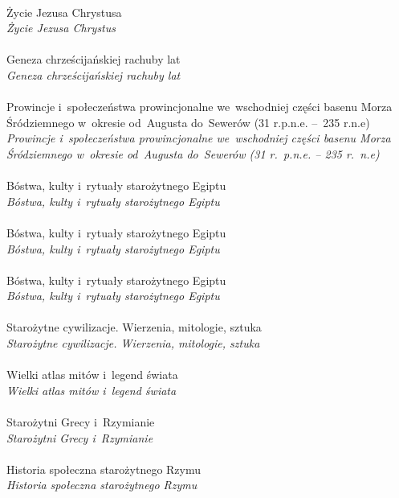 \documentclass[a4paper,11pt]{article}
\begin{document}
 \\
\Jest  Życie Jezusa Chrystusa \\
\Powin \emph{Życie Jezusa Chrystus} \\
 \\
\Jest  Geneza chrześcijańskiej rachuby lat \\
\Powin \emph{Geneza chrześcijańskiej rachuby lat} \\
 \\
\Jest Prowincje i~społeczeństwa prowincjonalne we~wschodniej części
basenu Morza Śródziemnego w~okresie od~Augusta do~Sewerów
(31 r.p.n.e. --~235 r.n.e) \\
\Powin \emph{Prowincje i~społeczeństwa prowincjonalne we~wschodniej
  części basenu Morza Śródziemnego w~okresie od~Augusta do~Sewerów
  (31 r.~p.n.e. -- 235 r.~n.e)} \\
 \\
\Jest  Bóstwa, kulty i~rytuały starożytnego Egiptu \\
\Powin \emph{Bóstwa, kulty i~rytuały starożytnego Egiptu} \\
 \\
\Jest  Bóstwa, kulty i~rytuały starożytnego Egiptu \\
\Powin \emph{Bóstwa, kulty i~rytuały starożytnego Egiptu} \\
 \\
\Jest  Bóstwa, kulty i~rytuały starożytnego Egiptu \\
\Powin \emph{Bóstwa, kulty i~rytuały starożytnego Egiptu} \\
 \\
\Jest  Starożytne cywilizacje. Wierzenia, mitologie, sztuka \\
\Powin \emph{Starożytne cywilizacje. Wierzenia, mitologie, sztuka} \\
 \\
\Jest  Wielki atlas mitów i~legend świata \\
\Powin \emph{Wielki atlas mitów i~legend świata} \\
 \\
\Jest  Starożytni Grecy i~Rzymianie \\
\Powin \emph{Starożytni Grecy i~Rzymianie} \\
 \\
\Jest  Historia społeczna starożytnego Rzymu \\
\Powin \emph{Historia społeczna starożytnego Rzymu} \\
\end{document}
